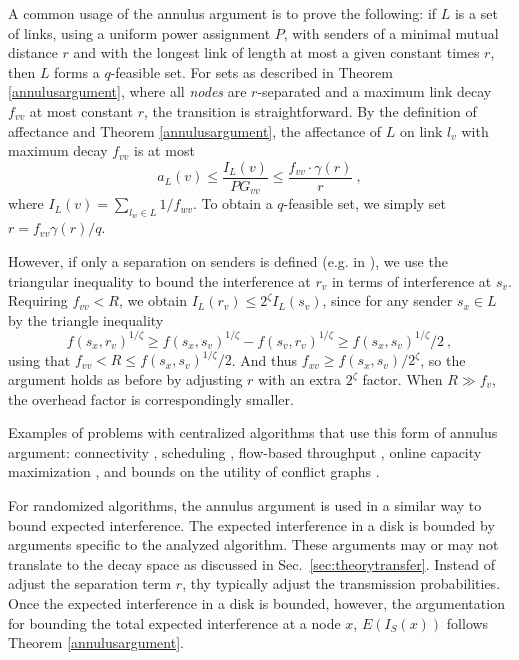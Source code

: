 \documentclass[11pt]{amsart}
\begin{document}
A common usage of the annulus argument is to prove the following: if
$L$ is a set of links, using a uniform power assignment $P$, with
senders of a minimal mutual distance $r$ and with the longest link of
length at most a given constant times $r$, then $L$ forms a $q$-feasible set. 
For sets as described in Theorem \ref{annulusargument}, where all
\emph{nodes} are $r$-separated and a maximum link decay $f_{vv}$ at most
constant $r$, the transition is straightforward.
By the definition of affectance and Theorem \ref{annulusargument}, 
the affectance of $L$ on link $l_v$ with maximum decay $f_{vv}$ is at most 
$$ a_L(v) \leq \frac{I_L(v)}{P G_{vv}} \leq \frac{f_{vv} \cdot \gamma(r)}{r} \ ,$$
where $I_L(v) = \sum_{l_w \in L} 1/f_{wv}$.
To obtain a $q$-feasible set, we simply set $r = f_{vv}\gamma(r)/q$.


However, if only a separation on senders is defined (e.g. in \cite{us:talg12}), 
we use the triangular inequality to bound the interference at $r_v$ in terms of interference at $s_v$.
Requiring $f_{vv} < R$, we obtain $ I_L(r_v) \leq 2^\zeta I_L(s_v)$, since for any sender $s_x \in L$ by the triangle inequality
$$f(s_x, r_v)^{1/\zeta} \geq f(s_x, s_v)^{1/\zeta} - f(s_v, r_v) ^ {1/\zeta} \geq f(s_x, s_v)^{1/\zeta}/2\ ,$$
using that $f_{vv} < R \le f(s_x, s_v)^{1/\zeta}/2$.
And thus $f_{xv} \ge f(s_x,s_v)/2^\zeta$, so the argument holds as
before by adjusting $r$ with an extra $2^\zeta$ factor.
When $R \gg f_v$, the overhead factor is correspondingly smaller.


Examples of problems with centralized algorithms that use this form of annulus argument:
connectivity \cite{MoWa06,moscibroda06b,Moscibroda07,SODA12},
scheduling \cite{chafekar07,tonoyan2012},
flow-based throughput \cite{CKMPS08},
online capacity maximization \cite{fanghanel2013online},
and bounds on the utility of conflict graphs \cite{tonoyan2013,tonoyan2013a}.

For randomized algorithms, the annulus argument is used in 
a similar way to bound expected interference.  The expected
interference in a disk is bounded by arguments specific to the
analyzed algorithm.
 These arguments may or may not translate to the
decay space as discussed in Sec.~\ref{sec:theorytransfer}.
Instead of adjust the separation term $r$, thy typically adjust the transmission probabilities.
Once the expected interference in a disk is bounded, however, the
argumentation for bounding the total expected interference at a node
$x$, $E(I_S(x))$ follows Theorem \ref{annulusargument}.  
\end{document}
